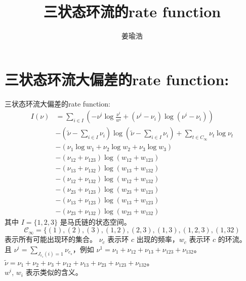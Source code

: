 \documentclass[cn,hazy,egreen,14pt,normal]{elegantnote}
\title{三状态环流的rate function}
\author{姜瑜浩}
\date{\zhtoday}
\begin{document}
\section{三状态环流大偏差的rate function:}
三状态环流大偏差的rate function:
\begin{align*}
    I(\nu) 
    &= \sum_{i \in I} \left(-\nu^{i} \log \frac{\nu^{i}}{w^{i}} + (\nu^{i} - \nu_{i}) \log(\nu^{i} - \nu_{i})\right) \\
    &-(\tilde{\nu} - \sum_{i \in I} \nu_i) \log (\tilde{\nu} - \sum_{i \in I} \nu_i)
    +\sum_{t \in C_{\infty}} \nu_t \log \nu_t \\
    &- (\nu_{1} \log w_{1} + \nu_{2} \log w_{2} + \nu_{3} \log w_{3})\\
    &- (\nu_{12} + \nu_{123}) \log(w_{12} + w_{123}) \\
    &- (\nu_{13} + \nu_{132}) \log(w_{13} + w_{132}) \\
    &- (\nu_{12} + \nu_{132}) \log(w_{12} + w_{132}) \\
    &- (\nu_{23} + \nu_{123}) \log(w_{23} + w_{123}) \\
    &- (\nu_{13} + \nu_{123}) \log(w_{13} + w_{123}) \\
    &- (\nu_{23} + \nu_{132}) \log(w_{23} + w_{132}) 
\end{align*}
其中 $I=\{1, 2, 3\}$ 是马氏链的状态空间。
$$\mathcal{C}_{\infty} = \{(1), (2), (3), (1,2), (2,3), (1,3), (1,2,3), (1, 32)$$
表示所有可能出现环的集合。
$\nu_c$ 表示环 $c$ 出现的频率，$w_c$ 表示环 $c$ 的环流。\\
且 $\nu^{i} = \sum_{J_{c_s}(i)=1} \nu_{c_s}$，例如 $\nu^{1} = \nu_{1} + \nu_{12} + \nu_{13} + \nu_{123} +\nu_{132}$。
$\tilde{\nu} = \nu_{1} + \nu_{2} + \nu_{3} + \nu_{12} + \nu_{13} + \nu_{23} + \nu_{123} +\nu_{132}$。\\
$w^i$, $w_i$ 表示类似的含义。
\end{document}
